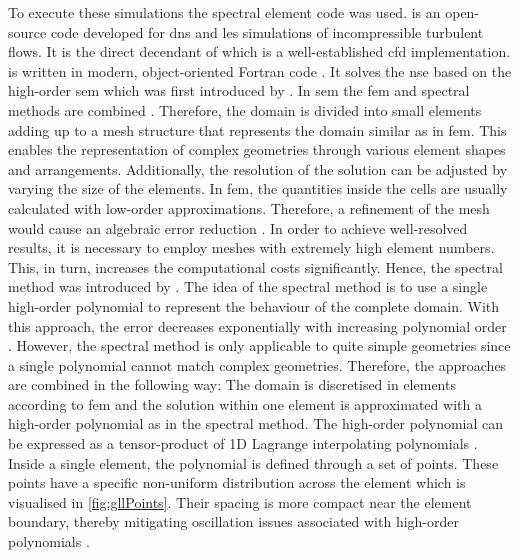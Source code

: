To execute these simulations the spectral element code  was used. 
 is an open-source code developed for \acrshort{dns} and \acrshort{les} simulations of incompressible turbulent flows.
It is the direct decendant of  which is a well-established \acrshort{cfd} implementation.
 is written in modern, object-oriented Fortran code \citep{jansson_neko_2024}.
It solves the \acrshort{nse} based on the high-order \acrfull{sem} which was first introduced by \citet{patera_spectral_1984}.
In \acrshort{sem} the \acrfull{fem} and spectral methods are combined \citep{patera_spectral_1984}.
Therefore, the domain is divided into small elements adding up to a mesh structure that represents the domain similar as in \acrshort{fem}.
This enables the representation of complex geometries through various element shapes and arrangements.
Additionally, the resolution of the solution can be adjusted by varying the size of the elements.
In \acrshort{fem}, the quantities inside the cells are usually calculated with low-order approximations.
Therefore, a refinement of the mesh would cause an algebraic error reduction \citep{deville_high-order_2002}. 
In order to achieve well-resolved results, it is necessary to employ meshes with extremely high element numbers. This, in turn, increases the computational costs significantly.
Hence, the spectral method was introduced by \citep{patera_spectral_1984}.
The idea of the spectral method is to use a single high-order polynomial to represent the behaviour of the complete domain.
With this approach, the error decreases exponentially with increasing polynomial order \citep{deville_high-order_2002}.
However, the spectral method is only applicable to quite simple geometries since a single polynomial cannot match complex geometries.
Therefore, the approaches are combined in the following way:
The domain is discretised in elements according to \acrshort{fem} and the solution within one element is approximated with a high-order polynomial as in the spectral method.
The high-order polynomial can be expressed as a tensor-product of 1D Lagrange interpolating polynomials \citep{deville_high-order_2002}.
Inside a single element, the polynomial is defined through a set of points.
These  points have a specific non-uniform distribution across the element which is visualised in \autoref{fig:gllPoints}.
Their spacing is more compact near the element boundary, thereby mitigating oscillation issues associated with high-order polynomials \citep{deville_high-order_2002}.
